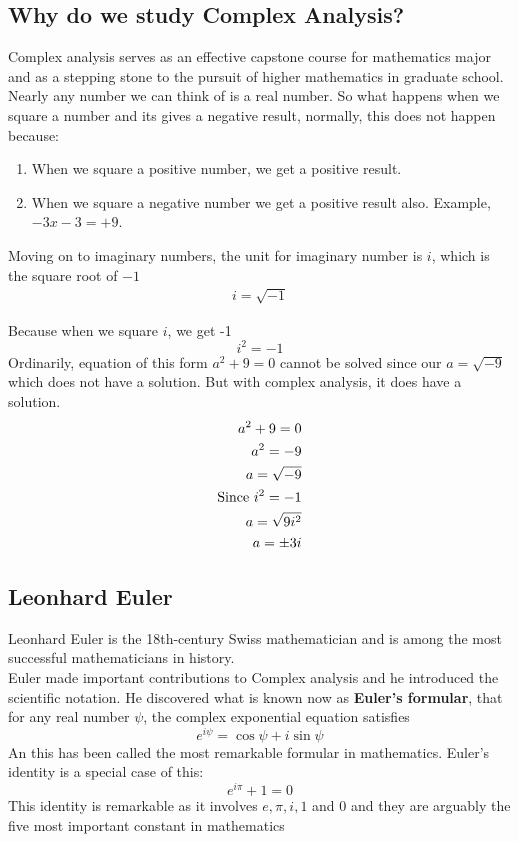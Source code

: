 \documentclass[12pt]{report}
\newcommand{\sps}{\\[0.2cm]}
\newcommand{\NI}{\noindent}
\begin{document}
	\subsection{Why do we study Complex Analysis?}
	Complex analysis serves as an effective capstone course for mathematics major and as a stepping stone to the pursuit of higher mathematics in graduate school.\\
	
	\NI Nearly any number we can think of is a real number. So what happens when we square a number and its gives a negative result, normally, this does not happen because:
	\begin{enumerate}
		\item When we square a positive number, we get a positive result.
		\item When we square a negative number we get a positive result also. Example, $-3x - 3 = +9$.
	\end{enumerate}
	
	\NI Moving on to imaginary numbers, the unit for imaginary number is $i$, which is the square root of $-1$
	\begin{eqnarray}
		i=\sqrt{-1}
	\end{eqnarray}
		

	Because when we square $i$, we get -1
	\begin{equation}
		i^2 = -1
	\end{equation}
	Ordinarily, equation of this form $a^2+9=0$ cannot be solved since our $a=\sqrt{-9}$ which does not have a solution. But with complex analysis, it does have a solution.
	\begin{eqnarray}
		a^2+9=0\notag\\
		a^2=-9\notag\\
		a=\sqrt{-9}\notag\\
		\text{Since } i^2=-1\notag\\
		a = \sqrt{9 i^2}\notag\\
		a = \pm 3i\notag
	\end{eqnarray}
	\subsection{Leonhard Euler}
	Leonhard Euler is the 18th-century Swiss mathematician and is among the most successful mathematicians in history.\\
	Euler made important contributions to Complex analysis and he introduced the scientific notation. He discovered what is known now as \textbf{Euler's formular}, that for any real number $\psi$, the complex exponential equation satisfies
	\begin{equation}
		e^{i\psi} = \cos\psi + i\sin\psi
	\end{equation}
	An this has been called the most remarkable formular in mathematics. Euler's identity is a special case of this:
	\begin{equation}
		e^{i\pi} + 1 = 0
	\end{equation}
	This identity is remarkable as it involves $e,\pi,i,1$ and $0$ and they are arguably the five most important constant in mathematics\sps
	
\end{document}
